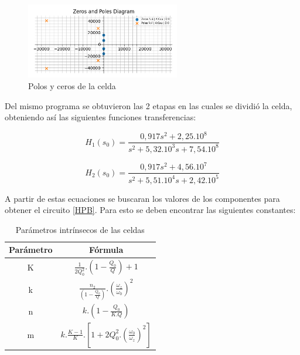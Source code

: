 \begin{figure}[h]
	\includegraphics[width=0.6\textwidth]{../Ejercicio2-DisenoDeCeldas/3CeldaSedra/Imagenes/PolosSedra.png}
	\centering
	\caption{Polos y ceros de la celda}
	\label{PolosSedra}
\end{figure}

Del mismo programa se obtuvieron las 2 etapas en las cuales se dividió la celda, obteniendo así las siguientes funciones transferencias:


\begin{equation}
H_1(s_0) = \frac{0,917 s^2  + 2,25.10^8}{s^2 + 5,32.10^3 s + 7,54.10^8}
\label{EcH1sedra}
\end{equation}

\begin{equation}
H_2(s_0) = \frac{0,917 s^2  + 4,56.10^7}{s^2 + 5,51.10^4 s + 2,42.10^5}
\label{EcH2sedra}
\end{equation}

A partir de estas ecuaciones se buscaran los valores de los componentes para obtener el circuito \ref{HPB}. Para esto se deben encontrar las siguientes constantes:

\begin{table}[h]
\begin{tabular}{|c|c|}
\hline
\textbf{Parámetro} & \textbf{Fórmula} 													   \\ \hline
K                  & $\frac{1}{2Q_0^2} . (1 - \frac{Q_0}{Q}) + 1 $     					        \\ \hline
k                  & $ \frac{n_2}{(1 - \frac{Q_0}{Q})} . (\frac{\omega_z}{\omega_0})^2$   \\ \hline
n                  & $k.(1- \frac{Q_0}{K.Q})$             									\\ \hline
m                  & $k.\frac{K-1}{K}. [1 + 2Q_0^2. (\frac{\omega_0}{\omega_z})^2]$              \\ \hline
\end{tabular}
\centering
\caption{Parámetros intrínsecos de las celdas}
\label{paramSedra}
\end{table}


